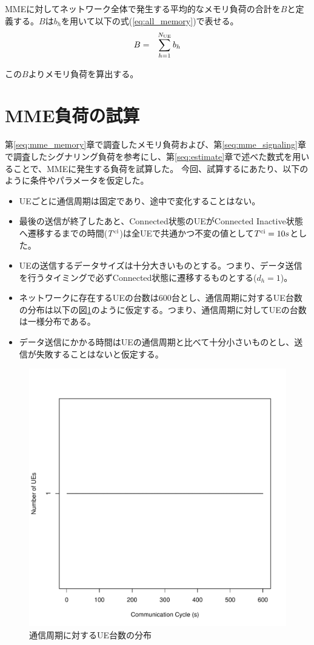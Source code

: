 \documentclass[a4j]{ujarticle}
\begin{document}
MMEに対してネットワーク全体で発生する平均的なメモリ負荷の合計を$B$と定義する。$B$は$b_h$を用いて以下の式(\ref{eq:all_memory})で表せる。
\begin{eqnarray}
  B & = & \sum_{h = 1}^{N_{\rm UE}} b_h \label{eq:all_memory}
\end{eqnarray}


この$B$よりメモリ負荷を算出する。



\section{MME負荷の試算}
第\ref{seq:mme_memory}章で調査したメモリ負荷および、第\ref{seq:mme_signaling}章で調査したシグナリング負荷を参考にし、第\ref{seq:estimate}章で述べた数式を用いることで、MMEに発生する負荷を試算した。
今回、試算するにあたり、以下のように条件やパラメータを仮定した。
\begin{itemize}
  \item UEごとに通信周期は固定であり、途中で変化することはない。
  \item 最後の送信が終了したあと、Connected状態のUEがConnected Inactive状態へ遷移するまでの時間($T^{\rm ci}$)は全UEで共通かつ不変の値として$T^{\rm ci} = 10s$とした。
  \item UEの送信するデータサイズは十分大きいものとする。つまり、データ送信を行うタイミングで必ずConnected状態に遷移するものとする($d_h = 1$)。
  \item ネットワークに存在するUEの台数は600台とし、通信周期に対するUE台数の分布は以下の図\ref{UE_cycle}のように仮定する。つまり、通信周期に対してUEの台数は一様分布である。
  \item データ送信にかかる時間はUEの通信周期と比べて十分小さいものとし、送信が失敗することはないと仮定する。
\end{itemize}
\begin{figure}[htbp]
  \centering
  \includegraphics[width=0.9\hsize]{UE_cycle.pdf}
  \caption{通信周期に対するUE台数の分布}
  \label{UE_cycle}
\end{figure}
\end{document}
